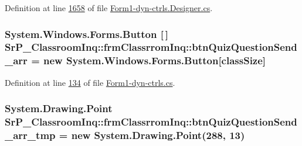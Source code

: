 \-Definition at line \hyperlink{_form1-dyn-ctrls_8_designer_8cs_source_l01658}{1658} of file \hyperlink{_form1-dyn-ctrls_8_designer_8cs_source}{\-Form1-\/dyn-\/ctrls.\-Designer.\-cs}.

\hypertarget{class_sr_p___classroom_inq_1_1frm_classrrom_inq_a007012d0330b5c8ad6b29271ddefe7f9}{
\subsubsection[{btn\-Quiz\-Question\-Send\-\_\-arr}]{\setlength{\rightskip}{0pt plus 5cm}\-System.\-Windows.\-Forms.\-Button \mbox{[}$\,$\mbox{]} {\bf \-Sr\-P\-\_\-\-Classroom\-Inq\-::frm\-Classrrom\-Inq\-::btn\-Quiz\-Question\-Send\-\_\-arr} = new \-System.\-Windows.\-Forms.\-Button\mbox{[}{\bf class\-Size}\mbox{]}}}
\label{class_sr_p___classroom_inq_1_1frm_classrrom_inq_a007012d0330b5c8ad6b29271ddefe7f9}


\-Definition at line \hyperlink{_form1-dyn-ctrls_8cs_source_l00134}{134} of file \hyperlink{_form1-dyn-ctrls_8cs_source}{\-Form1-\/dyn-\/ctrls.\-cs}.

\hypertarget{class_sr_p___classroom_inq_1_1frm_classrrom_inq_a8dcbe5ae5d44d445994571c17345e756}{
\subsubsection[{btn\-Quiz\-Question\-Send\-\_\-arr\-\_\-tmp}]{\setlength{\rightskip}{0pt plus 5cm}\-System.\-Drawing.\-Point {\bf \-Sr\-P\-\_\-\-Classroom\-Inq\-::frm\-Classrrom\-Inq\-::btn\-Quiz\-Question\-Send\-\_\-arr\-\_\-tmp} = new \-System.\-Drawing.\-Point(288, 13)}}
\label{class_sr_p___classroom_inq_1_1frm_classrrom_inq_a8dcbe5ae5d44d445994571c17345e756}


